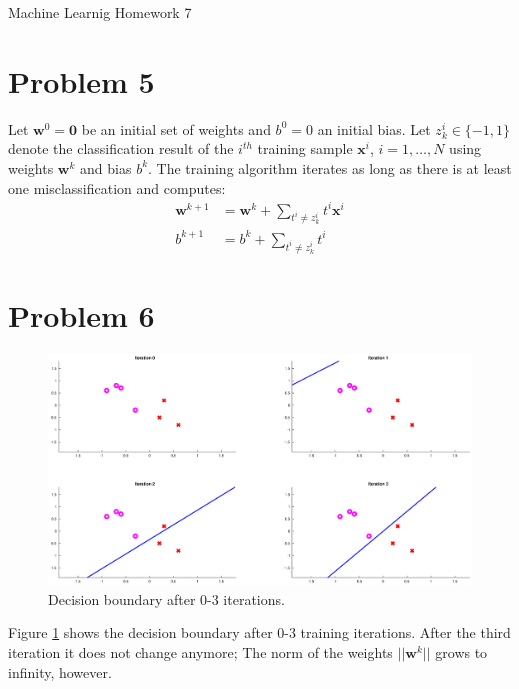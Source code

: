 \documentclass[12pt]{article}
\begin{document}
\begin{center}
{\Large Machine Learnig Homework 7} \\[.3in]
\end{center}
\vspace*{.5in}



\section*{Problem 5}

Let $\mathbf{w}^0 = \mathbf{0}$ be an initial set of weights and $b^0 = 0$ an initial bias. Let $z_k^i \in \{-1, 1\}$ denote the classification result of the $i^{th}$ training sample $\mathbf{x}^i$, $i = 1, \ldots, N$ using weights $\mathbf{w}^k$ and bias $b^k$. The training algorithm iterates as long as there is at least one misclassification and computes:
\begin{equation}
\begin{align}
  \mathbf{w}^{k+1} &= \mathbf{w}^k + \sum_{t^i \neq z_k^i} t^i \mathbf{x}^i \\
  b^{k+1} &= b^k + \sum_{t^i \neq z_k^i} t^i
\end{align}
\label{eq:train}
\end{equation}

\section*{Problem 6}

\begin{figure}[!ht]
 \includegraphics[width=\textwidth]{perceptron6}
 \caption{Decision boundary after 0-3 iterations.}
 \label{fig:prob6}
\end{figure}

Figure \ref{fig:prob6} shows the decision boundary after 0-3 training iterations. After the third iteration it does not change anymore; The norm of the weights $||\mathbf{w}^k||$ grows to infinity, however.
\end{document}
